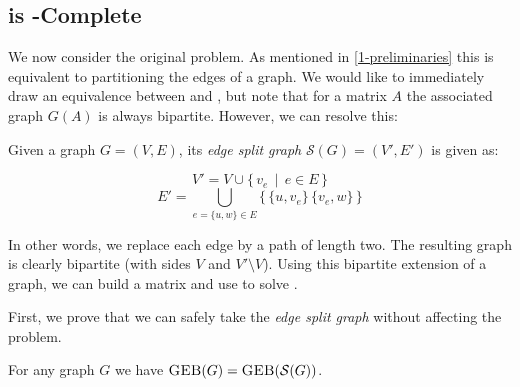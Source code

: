 	\subsection{\mbpt is \NP-Complete}

	We now consider the original \mbpt problem. As mentioned in
	\autoref{1-preliminaries} this is equivalent to partitioning the edges of
	a graph. We would like to immediately draw an equivalence between \mbpt
	and \geb, but note that for a matrix $A$ the associated graph $G(A)$ is
	always bipartite. However, we can resolve this:

	\begin{definition}
		Given a graph $G = (V, E)$, its \textit{edge split graph}
		$\mathcal{S}(G) = (V', E')$ is given as:

		$$V' = V \cup \{\, v_e \,\mid\, e \in E \,\}$$
		$$E' = \bigcup_{e = \{u, w\} \in E} \{\,\{u, v_e\}\, \{v_e, w\}\,\}$$
	\end{definition}

	In other words, we replace each edge by a path of length two. The resulting
	graph is clearly bipartite (with sides $V$ and $V' \setminus V$). Using
	this bipartite extension of a graph, we can build a matrix and use \mbpt
	to solve \geb.

	First, we prove that we can safely take the \textit{edge split graph}
	without affecting the \geb problem.

	\begin{proposition}
		\label{split-graph}
		For any graph $G$ we have $\textsc{GEB}(G) = \textsc{GEB}(\mathcal{S}(G))$.
	\end{proposition}

